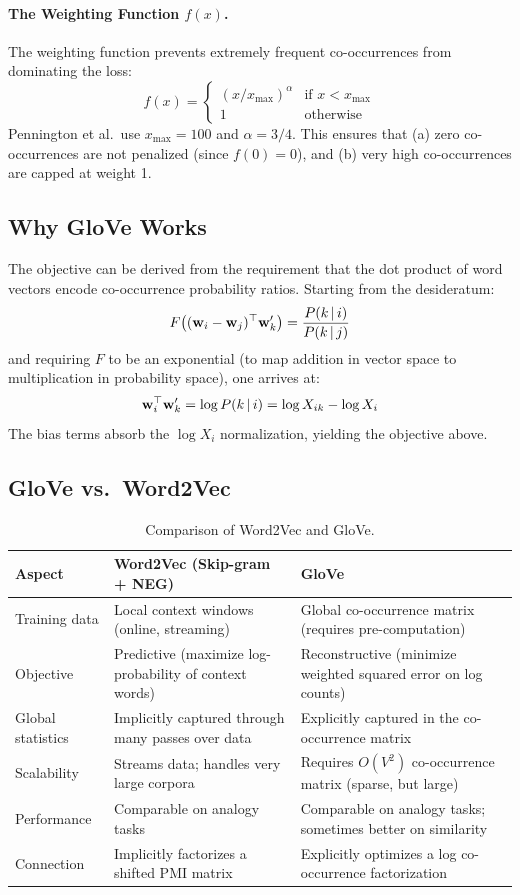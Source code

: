 \paragraph{The Weighting Function $f(x)$.}
The weighting function prevents extremely frequent co-occurrences from
dominating the loss:
\[
    f(x) = \begin{cases}
        (x / x_{\max})^\alpha & \text{if } x < x_{\max} \\
        1 & \text{otherwise}
    \end{cases}
\]
Pennington et al.\ use $x_{\max} = 100$ and $\alpha = 3/4$.  This ensures
that (a) zero co-occurrences are not penalized (since $f(0) = 0$), and (b)
very high co-occurrences are capped at weight 1.

\subsection{Why GloVe Works}

The objective can be derived from the requirement that the dot product of word
vectors encode co-occurrence probability ratios.  Starting from the
desideratum:
\[
    F\bigl((\mathbf{w}_i - \mathbf{w}_j)^\top \mathbf{w}'_k\bigr)
    = \frac{P(k \,|\, i)}{P(k \,|\, j)}
\]
and requiring $F$ to be an exponential (to map addition in vector space to
multiplication in probability space), one arrives at:
\[
    \mathbf{w}_i^\top \mathbf{w}'_k = \log P(k \,|\, i) = \log X_{ik} - \log X_i
\]
The bias terms absorb the $\log X_i$ normalization, yielding the objective
above.

\subsection{GloVe vs.\ Word2Vec}

\begin{table}[H]
\centering
\caption{Comparison of Word2Vec and GloVe.}
\label{tab:w2v_vs_glove}
\begin{tabularx}{\textwidth}{l X X}
\toprule
\textbf{Aspect} & \textbf{Word2Vec (Skip-gram + NEG)} & \textbf{GloVe} \\
\midrule
Training data & Local context windows (online, streaming) &
    Global co-occurrence matrix (requires pre-computation) \\
Objective & Predictive (maximize log-probability of context words) &
    Reconstructive (minimize weighted squared error on log counts) \\
Global statistics & Implicitly captured through many passes over data &
    Explicitly captured in the co-occurrence matrix \\
Scalability & Streams data; handles very large corpora &
    Requires $O(V^2)$ co-occurrence matrix (sparse, but large) \\
Performance & Comparable on analogy tasks &
    Comparable on analogy tasks; sometimes better on similarity \\
Connection & Implicitly factorizes a shifted PMI matrix &
    Explicitly optimizes a log co-occurrence factorization \\
\bottomrule
\end{tabularx}
\end{table}

